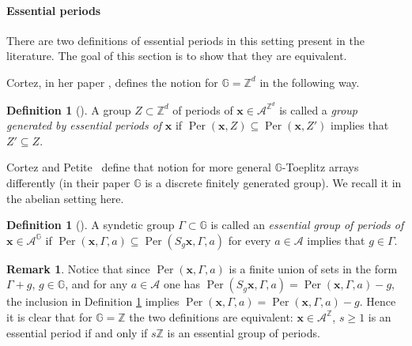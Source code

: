 \documentclass[leqno,a4paper,12pt]{article}
\theoremstyle{definition}
\newtheorem{Remark}[Th]{Remark}
\newtheorem{Def}[Th]{Definition}
\newcommand{\Per}{\operatorname{Per}\nolimits}
\newcommand{\Z}{{\mathbb{Z}}}
\newcommand{\G}{\mathbb{G}}
\newcommand{\n}{{\mathbf{n}}}
\newcommand{\m}{{\mathbf{m}}}
\begin{document}
\paragraph{Essential periods}


There are two definitions of essential periods in this setting present in the literature. The goal of this section is to show that they are equivalent.


Cortez, in her paper \cite{MR2220753}, defines the notion for $\G=\Z^d$ in the following way.
\begin{Def}[{\cite[Definition 15]{MR2220753}}]\label{essential_C}
A group $Z\subset\Z^d$ of periods of $\bm{x}\in \mathcal{A}^{\Z^d}$ is called a \emph{group generated by essential periods of} $\bm{x}$ if $\Per(\bm{x},Z)\subseteq\Per(\bm{x},Z')$ implies that $Z'\subseteq Z$.
\end{Def}
Cortez and Petite~\cite{MR2427048} define that notion for more general $\G$-Toeplitz arrays differently (in their paper $\G$ is a discrete finitely generated group). We recall it in the abelian setting here.
\begin{Def}[{\cite[Definition 4]{MR2427048}}]\label{essential_CP}
A syndetic group $\Gamma\subset\G$ is called an \emph{essential group of periods of} $\bm{x}\in\mathcal{A}^\G$ if $\Per(\bm{x},\Gamma,a)\subseteq\Per(S_g\bm{x},\Gamma,a)$ for every $a\in\mathcal{A}$
implies that $g\in\Gamma$.
\end{Def}
\begin{Remark}
Notice that since $\Per(\bm{x},\Gamma,a)$ is a finite union of sets in the form $\Gamma+g$, $g\in\G$, and for any $a\in\mathcal{A}$ one has $\Per(S_g\bm{x},\Gamma,a)=\Per(\bm{x},\Gamma,a)-g$, the inclusion in Definition \ref{essential_CP} implies $\Per(\bm{x},\Gamma,a)=\Per(\bm{x},\Gamma,a)-g$. Hence it is clear that for $\G=\Z$ the two definitions are equivalent: $\bm{x}\in\mathcal{A}^\Z$, $s\geq 1$ is an essential period if and only if $s\Z$ is an essential group of periods.
\end{Remark}
\end{document}
